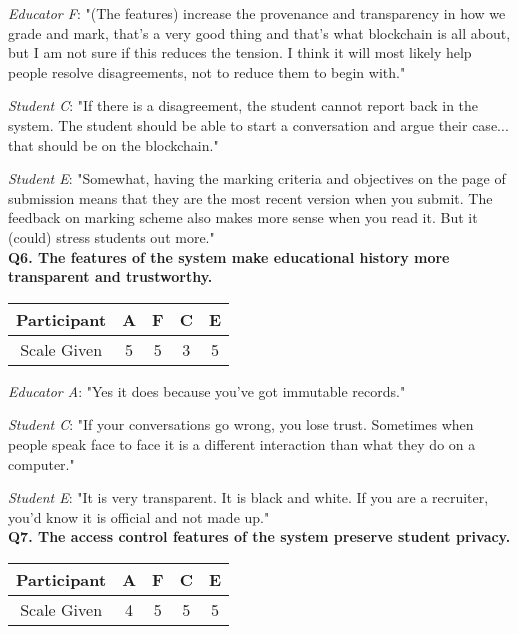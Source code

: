 \textit{Educator F}: "(The features) increase the provenance and transparency in how we grade and mark,
that's a very good thing and that's what blockchain is all about, but I am not sure if this reduces the tension.
I think it will most likely help people resolve disagreements, not to reduce them to begin with."

\textit{Student C}: "If there is a disagreement, the student cannot report back in the system. The student should be
able to start a conversation and argue their case... that should be on the blockchain."

\textit{Student E}: "Somewhat, having the marking criteria and objectives on the page of submission means that they are the most  
recent version when you submit. The feedback on marking scheme also makes more sense when you read it. 
But it (could) stress students out more."\\

\textbf{Q6. The features of the system make educational history more transparent and trustworthy.}\\
\begin{table}[!ht]
	\centering
	\begin{tabularx}{0.325\textwidth}{|c|c|c|c|c|}
		\hline
		Participant & A                  & F                  & C                      & E \\
		\hline
		Scale Given & \cellcolor{green}5 & \cellcolor{green}5 & \cellcolor{Dandelion}3 & \cellcolor{green}5 \\
		\hline
	\end{tabularx}
\end{table}

\textit{Educator A}: "Yes it does because you've got immutable records."

\textit{Student C}: "If your conversations go wrong, you lose trust. Sometimes when people speak face to face
it is a different interaction than what they do on a computer."

\textit{Student E}: "It is very transparent. It is black and white. If you are a recruiter, you'd know it is official 
and not made up."\\

\textbf{Q7. The access control features of the system preserve student privacy.}\\
\begin{table}[!ht]
	\centering
	\begin{tabularx}{0.325\textwidth}{|c|c|c|c|c|}
		\hline
		Participant & A                        & F                  & C                  & E \\
		\hline
		Scale Given & \cellcolor{SpringGreen}4 & \cellcolor{green}5 & \cellcolor{green}5 & \cellcolor{green}5 \\
		\hline
	\end{tabularx}
\end{table}

